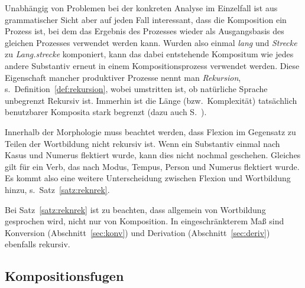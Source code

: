 Unabhängig von Problemen bei der konkreten Analyse im Einzelfall ist aus grammatischer Sicht aber auf jeden Fall interessant, dass die Komposition ein Prozess ist, bei dem das Ergebnis des Prozesses wieder als Ausgangsbasis des gleichen Prozesses verwendet werden kann.
Wurden also einmal \textit{lang} und \textit{Strecke} zu \textit{Lang.strecke} komponiert, kann das dabei entstehende Kompositum wie jedes andere Substantiv erneut in einem Kompositionsprozess verwendet werden.
Diese Eigenschaft mancher produktiver Prozesse nennt man \textit{Rekursion}, s.\ Definition~\ref{def:rekursion}, wobei umstritten ist, ob natürliche Sprache unbegrenzt Rekursiv ist.
Immerhin ist die Länge (bzw.\ Komplexität) tatsächlich benutzbarer Komposita stark begrenzt (dazu auch S.~\pageref{abs:syntaxrekursion}).


Innerhalb der Morphologie muss beachtet werden, dass Flexion im Gegensatz zu Teilen der Wortbildung nicht rekursiv ist.
Wenn ein Substantiv einmal nach Kasus und Numerus flektiert wurde, kann dies nicht nochmal geschehen.
Gleiches gilt für ein Verb, das nach Modus, Tempus, Person und Numerus flektiert wurde.
Es kommt also eine weitere Unterscheidung zwischen Flexion und Wortbildung hinzu, s.\ Satz~\ref{satz:reknrek}.


Bei Satz~\ref{satz:reknrek} ist zu beachten, dass allgemein von Wortbildung gesprochen wird, nicht nur von Komposition.
In eingeschränkterem Maß sind Konversion (Abschnitt~\ref{sec:konv}) und Derivation (Abschnitt~\ref{sec:deriv}) ebenfalls rekursiv.

\subsection{Kompositionsfugen}



